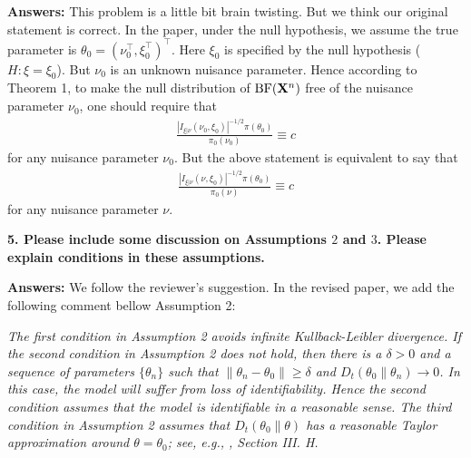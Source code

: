 \documentclass[11pt]{article}
\theoremstyle{plain}
\theoremstyle{definition}
\theoremstyle{remark}
\begin{document}
\textbf{Answers:}
This problem is a little bit brain twisting.
But we think our original statement is correct.
In the paper, under the null hypothesis, we assume the true parameter is $\theta_0 = (\nu_0^\top, \xi_0^\top)^\top$.
Here $\xi_0$ is specified by the null hypothesis ($H: \xi = \xi_0$).
But $\nu_0$ is an unknown nuisance parameter.
Hence according to Theorem 1, to make the null distribution of $\text{BF}(\mathbf{X}^n)$ free of the nuisance parameter $\nu_0$, one should require that
\begin{align*}
     \frac{\left| I_{\xi | \nu} (\nu_0, \xi_0) \right|^{-1/2} \pi(\theta_0) }{\pi_0(\nu_0)} \equiv c
\end{align*}
for any nuisance parameter $\nu_0$.
But the above statement is equivalent to say that
\begin{align*}
     \frac{\left| I_{\xi | \nu} (\nu, \xi_0) \right|^{-1/2} \pi(\theta_0) }{\pi_0(\nu)} \equiv c
\end{align*}
for any nuisance parameter $\nu$.



\textbf{
5.
Please include some discussion on Assumptions $2$ and $3$.
Please explain conditions in these assumptions.
}

\textbf{Answers:}
We follow the reviewer's suggestion.
In the revised paper, we add the following comment bellow Assumption 2:

\begin{adjustwidth}{1.5em}{1.5em}
    \emph{
            The first condition in Assumption 2 avoids infinite Kullback-Leibler divergence.
            If the second condition in Assumption 2 does not hold, then there is a $\delta>0$ and a sequence of parameters             $\{\theta_n\}$ such that $\|\theta_n - \theta_0\| \geq \delta$ and $D_t(\theta_0 \| \theta_n ) \to 0  $.
            In this case, the model will suffer from loss of identifiability.
            Hence the second condition assumes that the model is identifiable in a reasonable sense.
            The third condition in Assumption 2 assumes that $D_t(\theta_0 \| \theta)$ has a reasonable Taylor approximation around    $\theta =\theta_0$; see, e.g., \cite{Erven2014}, Section III. H.
    }
\end{adjustwidth}
\end{document}
